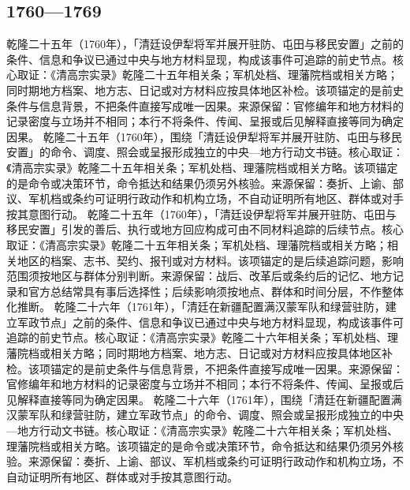 \subsection{1760—1769}
乾隆二十五年（1760年），「清廷设伊犁将军并展开驻防、屯田与移民安置」之前的条件、信息和争议已通过中央与地方材料显现，构成该事件可追踪的前史节点。核心取证：《清高宗实录》乾隆二十五年相关条；军机处档、理藩院档或相关方略；同时期地方档案、地方志、日记或对方材料应按具体地区补检。该项锚定的是前史条件与信息背景，不把条件直接写成唯一因果。来源保留：官修编年和地方材料的记录密度与立场并不相同；本行不将条件、传闻、呈报或后见解释直接等同为确定因果。
乾隆二十五年（1760年），围绕「清廷设伊犁将军并展开驻防、屯田与移民安置」的命令、调度、照会或呈报形成独立的中央—地方行动文书链。核心取证：《清高宗实录》乾隆二十五年相关条；军机处档、理藩院档或相关方略。该项锚定的是命令或决策环节，命令抵达和结果仍须另外核验。来源保留：奏折、上谕、部议、军机档或条约可证明行政动作和机构立场，不自动证明所有地区、群体或对手按其意图行动。
乾隆二十五年（1760年），「清廷设伊犁将军并展开驻防、屯田与移民安置」引发的善后、执行或地方回应构成可由不同材料追踪的后续节点。核心取证：《清高宗实录》乾隆二十五年相关条；军机处档、理藩院档或相关方略；相关地区的档案、志书、契约、报刊或对方材料。该项锚定的是后续追踪问题，影响范围须按地区与群体分别判断。来源保留：战后、改革后或条约后的记忆、地方记录和官方总结常具有事后选择性；后续影响须按地点、群体和时间分层，不作整体化推断。
乾隆二十六年（1761年），「清廷在新疆配置满汉蒙军队和绿营驻防，建立军政节点」之前的条件、信息和争议已通过中央与地方材料显现，构成该事件可追踪的前史节点。核心取证：《清高宗实录》乾隆二十六年相关条；军机处档、理藩院档或相关方略；同时期地方档案、地方志、日记或对方材料应按具体地区补检。该项锚定的是前史条件与信息背景，不把条件直接写成唯一因果。来源保留：官修编年和地方材料的记录密度与立场并不相同；本行不将条件、传闻、呈报或后见解释直接等同为确定因果。
乾隆二十六年（1761年），围绕「清廷在新疆配置满汉蒙军队和绿营驻防，建立军政节点」的命令、调度、照会或呈报形成独立的中央—地方行动文书链。核心取证：《清高宗实录》乾隆二十六年相关条；军机处档、理藩院档或相关方略。该项锚定的是命令或决策环节，命令抵达和结果仍须另外核验。来源保留：奏折、上谕、部议、军机档或条约可证明行政动作和机构立场，不自动证明所有地区、群体或对手按其意图行动。

